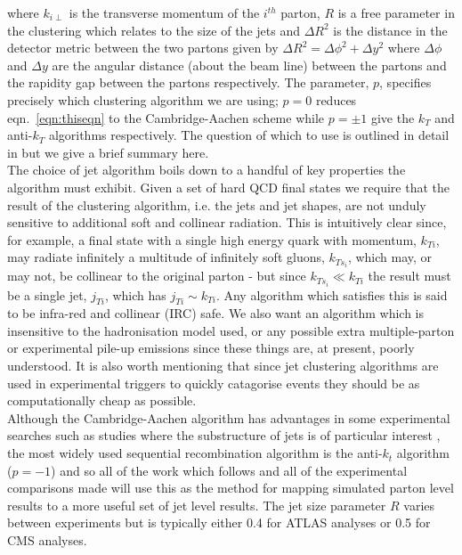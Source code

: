 	where $k_{i\perp}$ is the transverse momentum of the $i^{th}$ parton, $R$ is a free parameter in the clustering which relates
	to the size of the jets and $\Delta R^2$ is the distance in the detector metric between the two partons given by
	$\Delta R^2 = \Delta\phi^2 + \Delta y^2$ where $\Delta\phi$ and $\Delta y$ are the angular distance (about the beam line)
	between the partons and the rapidity gap between the partons respectively.  The parameter, $p$,
	specifies precisely which clustering algorithm we are using; $p=0$ reduces eqn.~\eqref{eqn:thiseqn} to the Cambridge-Aachen scheme while
	$p=\pm1$ give the $k_T$ and anti-$k_T$ algorithms respectively.  The question of which to use is outlined in detail in
	\cite{Cacciari:2008gp} but we give a brief summary here.\\The choice of jet algorithm boils down to a handful of key
	properties the algorithm must exhibit.  Given a set of hard QCD final states we require that the result of the
	clustering algorithm, i.e. the jets and jet shapes, are not unduly sensitive to additional soft and collinear radiation.
	This is intuitively clear since, for example, a final state with a single high energy quark with momentum, $k_{Ti}$,
	may radiate infinitely a multitude of infinitely soft gluons, $k_{Ts_i}$, which may, or may not, be collinear to the
	original parton - but since $k_{Ts_i}\ll k_{Ti}$ the result must be a single jet, $j_{Ti}$, which has $j_{Ti}\sim k_{Ti}$.
	Any algorithm which satisfies this is said to be infra-red and collinear (IRC) safe.  We also want an algorithm which
	is insensitive to the hadronisation model used, or any possible extra multiple-parton or experimental pile-up emissions
	since these things are, at present, poorly understood.  It is also worth mentioning that since jet clustering algorithms
	are used in experimental triggers to quickly catagorise events they should be as computationally cheap as possible.\\Although
	the Cambridge-Aachen algorithm has advantages in some experimental searches such as studies where the substructure of
	jets is of particular interest \cite{Butterworth:2008iy, Aad:2015owa}, the most widely used sequential recombination algorithm is
	the anti-$k_t$ algorithm ($p=-1$) and so all of the work which follows and all of the experimental comparisons made will
	use this as the method for mapping simulated parton level results to a more useful set of jet level results.  The jet size
	parameter $R$ varies between experiments but is typically either 0.4 for ATLAS analyses or 0.5 for CMS analyses.

